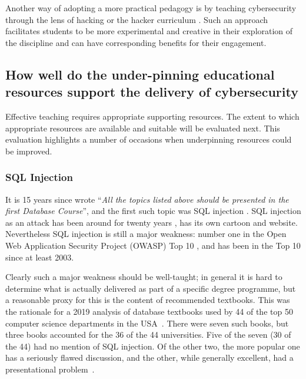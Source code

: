 \documentclass[sigconf]{acmart}
\begin{document}
Another way of adopting a more practical pedagogy is by teaching cybersecurity through the lens of hacking or the hacker curriculum \cite{bratus2010teaching}. Such an approach facilitates students to be more experimental and creative in their exploration of the discipline and can have corresponding benefits for their engagement. 

\begin{comment}


It is an interesting question as to whether standards such as PCI DSS should be addressed within degree courses (clearly degree courses can never cover all standards) or whether they should be addressed in professional training courses. However, the current situation is not ideal from the perspective of industry (or users of systems). The inclusion of key standards could be seen as a valuable enhancement activity to how cybersecurity it taught.

\end{comment}

\subsection{How well do the under-pinning educational resources support the delivery of cybersecurity}
Effective teaching requires appropriate supporting resources. The extent to which appropriate resources are available and suitable will be evaluated next. This evaluation highlights a number of occasions when underpinning resources could be improved.

\subsubsection{SQL Injection}
It is 15 years since \cite{Guimaraesetal2004} wrote ``{\emph{All the topics listed above should be presented in the first Database Course}}'', and the first such topic was SQL injection \cite{SPIDynamics2002,Anonymous2018b}. SQL injection as an attack has been around for twenty years \cite{HornerHyslip2017a}, has its own cartoon and website. Nevertheless SQL injection is still a major weakness: number one in the Open Web Application Security Project (OWASP) Top 10 \cite{OWASP2017a}, and has been in the Top 10 since at least 2003. 


Clearly such a major weakness should be well-taught; in general it is hard to determine what is actually delivered as part of a specific degree programme, but a reasonable proxy for this is the content of recommended textbooks. This was the rationale for a 2019 analysis of database textbooks used by 44 of the top 50 computer science departments in the USA~\cite{Drop2019}.  There were seven such books, but three books accounted for the 36 of the 44 universities. Five of the seven (30 of the 44) had no mention of SQL injection. Of the other two, the more popular one has a seriously flawed discussion, and the other, while generally excellent, had a presentational problem~\cite{Drop2019}.
\end{document}
